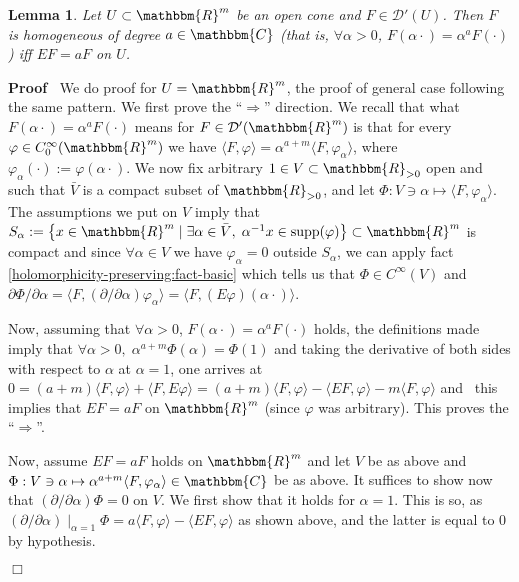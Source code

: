\documentclass[12pt]{article}
\newcommand{\assign}{:=}
\newcommand{\comma}{{,}}
\newcommand{\tmop}[1]{\ensuremath{\operatorname{#1}}}
\renewenvironment{proof}{\noindent\textbf{Proof\ }}{\hspace*{\fill}$\Box$\medskip}
\newtheorem{lemma}[proposition]{Lemma}
\theoremstyle{remark}
\begin{document}
\begin{lemma}
  \label{lem67:lem-homogImpliesE}Let $U \subset \mathbbm{R}^m$ be an open cone
  and $F \in \mathcal{D}' (U)$. Then $F$ is homogeneous of degree $a \in
  \mathbbm{C}$ (that is, $\forall \alpha > 0$, $F (\alpha \cdot) = \alpha^a F
  (\cdot)$) iff $E F = a F$ on $U$.
\end{lemma}

\begin{proof}
  We do proof for $U =\mathbbm{R}^m$, the proof of general case following the
  same pattern. We first prove the ``$\Rightarrow$'' direction. We recall that
  what $F (\alpha \cdot) = \alpha^a F (\cdot)$ means for $F \in \mathcal{D}'
  (\mathbbm{R}^m)$ is that for every $\varphi \in C^{\infty}_0
  (\mathbbm{R}^m)$ we have $\langle F, \varphi \rangle = \alpha^{a + m}
  \langle F, \varphi_{\alpha} \rangle$, where $\varphi_{\alpha} (\cdot)
  \assign \varphi (\alpha \cdot)$. We now fix arbitrary $1 \in V \subset
  \mathbbm{R}_{> 0}$ open and such that $\bar{V}$ is a compact subset of
  $\mathbbm{R}_{> 0}$, and let $\Phi : V \ni \alpha \mapsto \langle F,
  \varphi_{\alpha} \rangle$. The assumptions we put on $V$ imply that
  $S_{\alpha} \assign \left\{ x \in \mathbbm{R}^m \mid \exists \alpha \in
  \bar{V}, \; \alpha^{- 1} x \in \tmop{supp} (\varphi) \right\} \subset
  \mathbbm{R}^m$ is compact and since $\forall \alpha \in V$ we have
  $\varphi_{\alpha} = 0$ outside $S_{\alpha}$, we can apply fact
  \ref{holomorphicity-preserving:fact-basic} which tells us that $\Phi \in
  C^{\infty} (V)$ and $\partial \Phi / \partial \alpha = \langle F, (\partial
  / \partial \alpha) \varphi_{\alpha} \rangle = \langle F, (E \varphi) (\alpha
  \cdot) \rangle$.
  
  Now, assuming that $\forall \alpha > 0$, $F (\alpha \cdot) = \alpha^a F
  (\cdot)$ holds, the definitions made imply that $\forall \alpha > 0, \;
  \alpha^{a + m} \Phi (\alpha) = \Phi (1)$ and taking the derivative of both
  sides with respect to $\alpha$ at $\alpha = 1$, one arrives at $0 = (a + m)
  \langle F, \varphi \rangle + \langle F, E \varphi \rangle = (a + m) \langle
  F, \varphi \rangle - \langle E F, \varphi \rangle - m \langle F \comma
  \varphi \rangle$ and \ this implies that $E F = a F$ on $\mathbbm{R}^m$
  (since $\varphi$ was arbitrary). This proves the ``$\Rightarrow$''.
  
  Now, assume $E F = a F$ holds on $\mathbbm{R}^m$ and let $V$ be as above and
  $\Phi : V \ni \alpha \mapsto \alpha^{a + m} \langle F, \varphi_{\alpha}
  \rangle \in \mathbbm{C}$ be as above. It suffices to show now that
  $(\partial / \partial \alpha) \Phi = 0$ on $V$. We first show that it holds
  for $\alpha = 1$. This is so, as $(\partial / \partial \alpha)
  \mid_{\alpha = 1} \Phi = a \langle F, \varphi \rangle - \langle E F,
  \varphi \rangle$ as shown above, and the latter is equal to 0 by hypothesis.
  

\end{proof}
\end{document}
